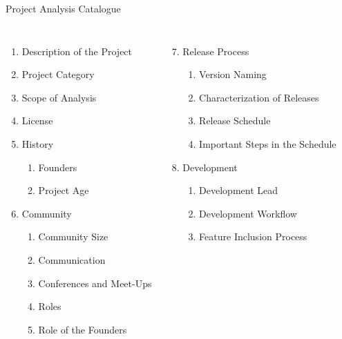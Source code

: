 \documentclass[11pt]{beamer}
\begin{document}
\begin{frame}[t]{Project Analysis Catalogue}
  \begin{columns}
  \begin{enumerate}
    \item Description of the Project
    \item Project Category
    \item Scope of Analysis
    \item License
    \item History
    \begin{enumerate}
      \item Founders
      \item Project Age
    \end{enumerate}
    \item Community
    \begin{enumerate}
      \item Community Size
      \item Communication
      \item Conferences and Meet-Ups
      \item Roles
      \item Role of the Founders
    \end{enumerate}
  \end{enumerate}
  \pause
  \begin{enumerate}
    \setcounter{enumi}{6}
    \item Release Process
    \begin{enumerate}
      \item Version Naming
      \item Characterization of Releases
      \item Release Schedule
      \item Important Steps in the Schedule
    \end{enumerate}
    \item Development
    \begin{enumerate}
      \item Development Lead
      \item Development Workflow
      \item Feature Inclusion Process
    \end{enumerate}
  \end{enumerate}
  \end{columns}
\end{frame}
\end{document}
